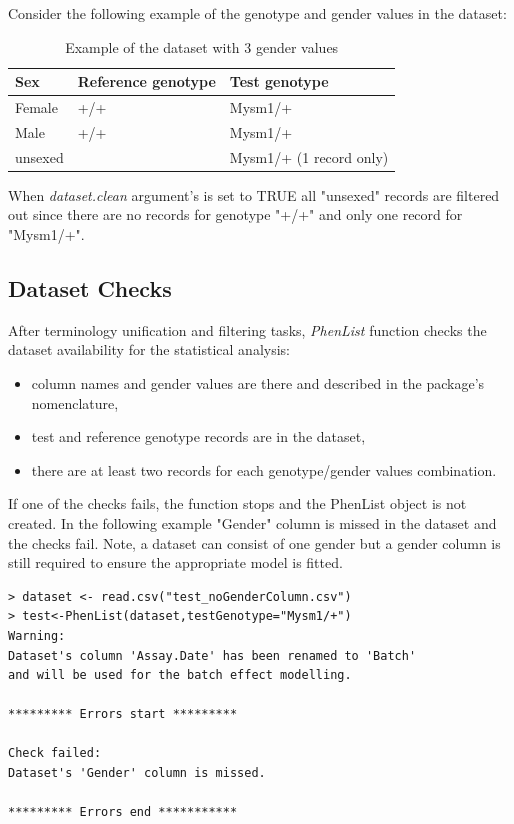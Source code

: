 \documentclass[12pt,a4paper]{article}
\begin{document}
Consider the following example of the genotype and gender values in the dataset:
\begin{table}[!h]
\begin{center}
\begin{tabular}{| l | l | l | }
  \hline
Sex&Reference genotype&Test genotype\\\hline
Female&+\slash +&Mysm1\slash +\\
Male&+\slash +&Mysm1\slash +\\
unsexed& &Mysm1\slash + (1 record only)\\
\hline  
\end{tabular}
\caption{Example of the dataset with 3 gender values}\label{table:04}
\end{center}
\end{table}

When \textit{dataset.clean} argument's is set to TRUE all "unsexed" records are filtered out since there are no records for genotype "+\slash +" and only one record for "Mysm1\slash +".

\subsection{Dataset Checks}
\label{section:DatasetChecks}
After terminology unification and filtering tasks, \textit{PhenList} function checks the dataset availability for the statistical analysis: 
\begin{itemize}
\item column names and gender values are there and described in the package's nomenclature, 
\item test and reference genotype records are in the dataset, 
\item there are at least two records for each genotype\slash gender values combination.
\end{itemize}

If one of the checks fails, the function stops and the PhenList object is not created. In the following example "Gender" column is missed in the dataset and the checks fail. 
Note, a dataset can consist of one gender but a gender column is still required to ensure the appropriate model is fitted.
\begingroup
    \fontsize{8pt}{12pt}\selectfont
\begin{verbatim}
> dataset <- read.csv("test_noGenderColumn.csv")
> test<-PhenList(dataset,testGenotype="Mysm1/+")
Warning:
Dataset's column 'Assay.Date' has been renamed to 'Batch' 
and will be used for the batch effect modelling.

********* Errors start *********

Check failed:
Dataset's 'Gender' column is missed.

********* Errors end ***********
\end{verbatim}
\endgroup
\end{document}
